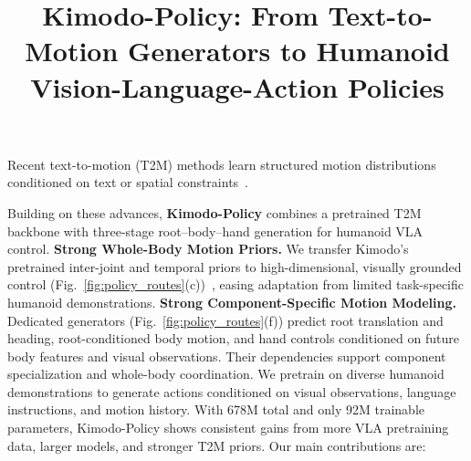 \documentclass{article}
\title{Kimodo-Policy: From Text-to-Motion Generators to Humanoid Vision-Language-Action Policies}
\begin{document}
Recent text-to-motion (T2M) methods learn structured motion distributions conditioned on text or spatial constraints~\cite{temos,mdm,mld,t2mgpt,momask,omnicontrol}.

Building on these advances, \textbf{Kimodo-Policy} combines a pretrained T2M backbone with three-stage root--body--hand generation for humanoid VLA control.
\textbf{ Strong Whole-Body Motion Priors.}
We transfer Kimodo's pretrained inter-joint and temporal priors to high-dimensional, visually grounded control (Fig.~\ref{fig:policy_routes}(c))~\cite{kimodo}, easing adaptation from limited task-specific humanoid demonstrations.
\textbf{ Strong Component-Specific Motion Modeling.}
Dedicated generators (Fig.~\ref{fig:policy_routes}(f)) predict root translation and heading, root-conditioned body motion, and hand controls conditioned on future body features and visual observations. Their dependencies support component specialization and whole-body coordination.
We pretrain on diverse humanoid demonstrations to generate actions conditioned on visual observations, language instructions, and motion history.
With 678M total and only 92M trainable parameters, Kimodo-Policy shows consistent gains from more VLA pretraining data, larger models, and stronger T2M priors. Our main contributions are:
\end{document}
